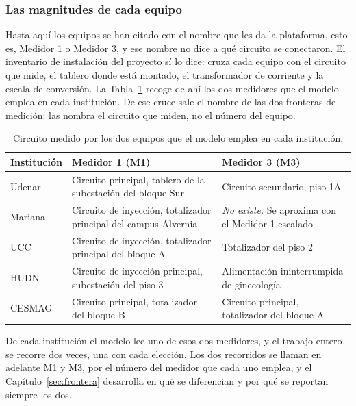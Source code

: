 \subsubsection*{Las magnitudes de cada equipo}

Hasta aquí los equipos se han citado con el nombre que les da la plataforma,
esto es, Medidor 1 o Medidor 3, y ese nombre no dice a qué circuito se
conectaron. El inventario de instalación del proyecto sí lo dice: cruza
cada equipo con el circuito que mide, el tablero donde está montado, el
transformador de corriente y la escala de conversión. La
Tabla~\ref{tab:dato-inventario} recoge de ahí los dos medidores que el
modelo emplea en cada institución. De ese cruce sale el nombre de las dos
fronteras de medición: las nombra el circuito que miden, no el número del
equipo.

\begin{table}[H]
    \centering
    \small
    \caption{Circuito medido por los dos equipos que el modelo emplea en
    cada institución.}
    \label{tab:dato-inventario}
    \begin{tabular}{@{}l >{\raggedright\arraybackslash}p{4.3cm}
                        >{\raggedright\arraybackslash}p{4.3cm}@{}}
    \toprule
    \textbf{Institución} & \textbf{Medidor 1 (M1)} &
    \textbf{Medidor 3 (M3)} \\
    \midrule
    Udenar   & Circuito principal, tablero de la subestación del bloque Sur
             & Circuito secundario, piso 1A \\
    \addlinespace
    Mariana  & Circuito de inyección, totalizador principal del campus
               Alvernia
             & \emph{No existe.} Se aproxima con el Medidor 1 escalado \\
    \addlinespace
    UCC      & Circuito de inyección, totalizador principal del bloque A
             & Totalizador del piso 2 \\
    \addlinespace
    HUDN     & Circuito de inyección principal, subestación del piso 3
             & Alimentación ininterrumpida de ginecología \\
    \addlinespace
    CESMAG   & Circuito principal, totalizador del bloque B
             & Circuito principal, totalizador del bloque A \\
    \bottomrule
    \end{tabular}
\end{table}

De cada institución el modelo lee uno de esos dos medidores, y el trabajo
entero se recorre dos veces, una con cada elección. Los dos recorridos se
llaman en adelante M1 y M3, por el número del medidor que cada uno emplea,
y el Capítulo~\ref{sec:frontera} desarrolla en qué se diferencian y por
qué se reportan siempre los dos.

